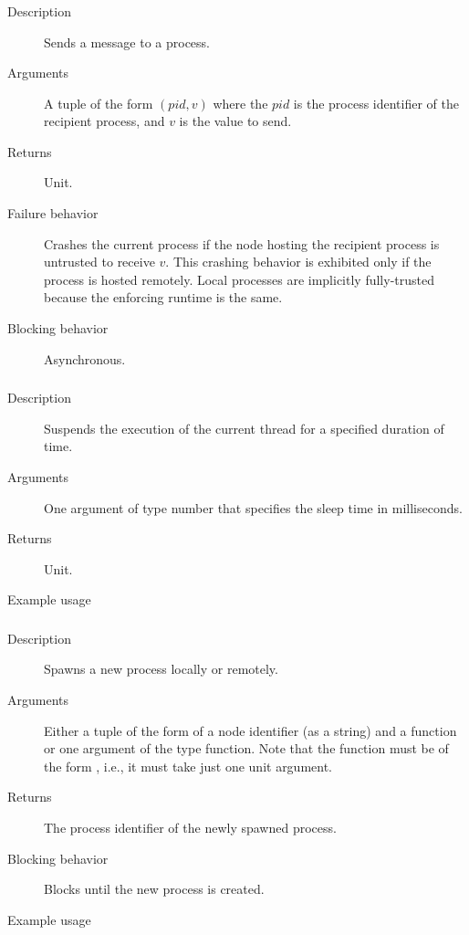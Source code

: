 \subsubsection{}
\begin{description}
    \item [Description] Sends a message to a process.
    \item [Arguments] A tuple of the form $(\mathit{pid}, v)$ where the $\mathit{pid}$ is the process identifier 
of the recipient process, and $v$ is the value to send.
    \item [Returns] Unit.
    \item [Failure behavior] Crashes the current process if the node hosting the recipient process is untrusted to receive $v$.
This crashing behavior is exhibited only if the process is hosted remotely. Local processes are implicitly fully-trusted because the 
enforcing runtime is the same.
    \item [Blocking behavior] Asynchronous.
\end{description}


\subsubsection{}

\begin{description}
    \item [Description] Suspends the execution of the current thread for a specified duration of time.  
    \item [Arguments] One argument of type number that specifies the sleep time in milliseconds.
    \item [Returns] Unit.
    \item [Example usage] 
\end{description}



\subsubsection{}
\begin{description}
    \item [Description] Spawns a new process locally or remotely.  
    \item [Arguments] Either a tuple of the form  of a node identifier (as a string) and a function 
or one argument of the type function. 
Note that the function must be of the form , i.e., it must take just one unit argument.
    \item [Returns] The process identifier of the newly spawned process.
    \item [Blocking behavior] Blocks until the new process is created.
    \item [Example usage] 

\end{description}

